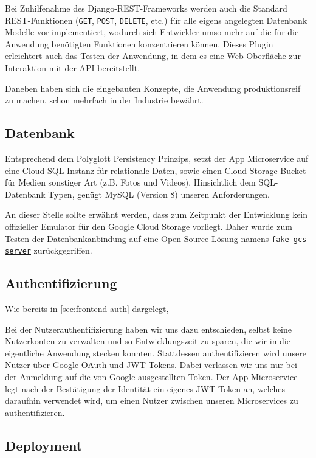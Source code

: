 \documentclass{article}
\begin{document}
Bei Zuhilfenahme des Django-REST-Frameworks werden auch die Standard REST-Funktionen (\texttt{GET}, \texttt{POST}, \texttt{DELETE}, etc.) für alle eigens angelegten Datenbank Modelle vor-implementiert, wodurch sich Entwickler umso mehr auf die für die Anwendung benötigten Funktionen konzentrieren können. Dieses Plugin erleichtert auch das Testen der Anwendung, in dem es eine Web Oberfläche zur Interaktion mit der API bereitstellt. 

Daneben haben sich die eingebauten Konzepte, die Anwendung produktionsreif zu machen, schon mehrfach in der Industrie bewährt. 


\subsection{Datenbank}

Entsprechend dem Polyglott Persistency Prinzips, setzt der App Microservice auf eine Cloud SQL Instanz für relationale Daten, sowie einen Cloud Storage Bucket für Medien sonstiger Art (z.B. Fotos und Videos). Hinsichtlich dem SQL-Datenbank Typen, genügt MySQL (Version 8) unseren Anforderungen. 

An dieser Stelle sollte erwähnt werden, dass zum Zeitpunkt der Entwicklung kein offizieller Emulator für den Google Cloud Storage vorliegt. Daher wurde zum Testen der Datenbankanbindung auf eine Open-Source Lösung namens \href{https://github.com/fsouza/fake-gcs-server}{\texttt{fake-gcs-server}} zurückgegriffen. 


\subsection{Authentifizierung}
\label{sec:app-backend-auth}

Wie bereits in \autoref{sec:frontend-auth} dargelegt, 

Bei der Nutzerauthentifizierung haben wir uns dazu entschieden, selbst keine Nutzerkonten zu verwalten und so Entwicklungszeit zu sparen, die wir in die eigentliche Anwendung stecken konnten. Stattdessen authentifizieren wird unsere Nutzer über Google OAuth und JWT-Tokens. Dabei verlassen wir uns nur bei der Anmeldung auf die von Google ausgestellten Token. Der App-Microservice legt nach der Bestätigung der Identität ein eigenes JWT-Token an, welches daraufhin verwendet wird, um einen Nutzer zwischen unseren Microservices zu authentifizieren.


\subsection{Deployment}
\end{document}
